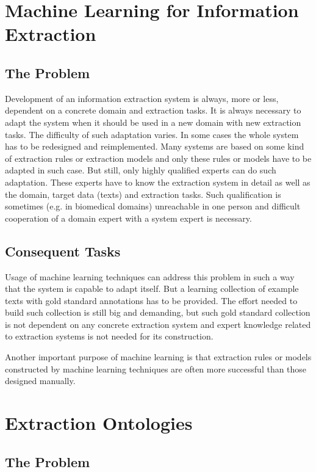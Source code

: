 \section{Machine Learning for Information Extraction}

\subsection{The Problem}

Development of an information extraction system is always, more or less, dependent on a concrete domain and extraction tasks. It is always necessary to adapt the system when it should be used in a new domain with new extraction tasks. The difficulty of such adaptation varies. In some cases the whole system has to be redesigned and reimplemented. Many systems are based on some kind of extraction rules or extraction models and only these rules or models have to be adapted in such case. But still, only highly qualified experts can do such adaptation. These experts have to know the extraction system in detail as well as the domain, target data (texts) and extraction tasks. Such qualification is sometimes (e.g. in biomedical domains) unreachable in one person and difficult cooperation of a domain expert with a system expert is necessary. 

\subsection{Consequent Tasks}

Usage of machine learning techniques can address this problem in such a way that the system is capable to adapt itself. But a learning collection of example texts with gold standard annotations has to be provided. The effort needed to build such collection is still big and demanding, but such gold standard collection is not dependent on any concrete extraction system and expert knowledge related to extraction systems is not needed for its construction. 

Another important purpose of machine learning is that extraction rules or models constructed by machine learning techniques are often more successful than those designed manually.

\section{Extraction Ontologies}

\subsection{The Problem}

